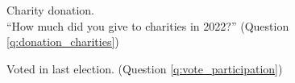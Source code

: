 \documentclass[12pt,english]{article}
\begin{document}
\begin{figure}[h!] 
    \caption[Charity donation]{Charity donation. \\ ``How much did you give to charities in 2022?'' (Question \ref{q:donation_charities})}\label{fig:donation_charities}
\end{figure}




\begin{figure}[h!]  
    \caption[Voted in last election]{Voted in last election. (Question \ref{q:vote_participation})}\label{fig:vote_participation}
\end{figure}
\end{document}
